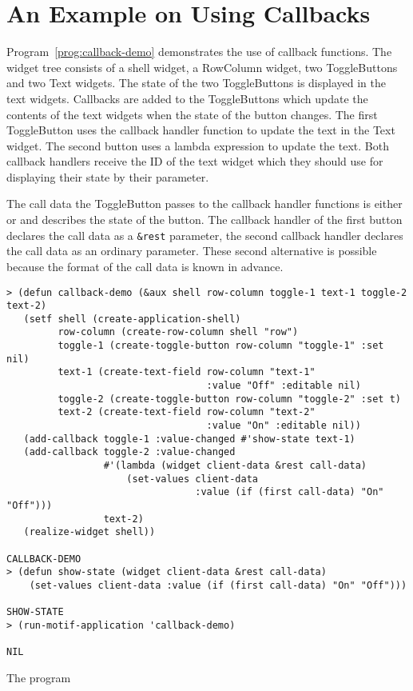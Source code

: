 \section{An Example on Using Callbacks}

Program~\ref{prog:callback-demo} demonstrates the use of callback functions. 
The widget tree consists of a shell widget, a RowColumn widget, two
ToggleButtons and two Text widgets.  The state of the two ToggleButtons is
displayed in the text widgets.  Callbacks are added to the ToggleButtons which
update the contents of the text widgets when the state of the button changes. 
The first ToggleButton uses the callback handler function  to
update the text in the Text widget.  The second button uses a lambda expression
to update the text.  Both callback handlers receive the ID of the text widget
which they should use for displaying their state by their 
parameter. 

The call data the ToggleButton passes to the callback handler functions is
either  or  and describes the state of the button.  The
callback handler of the first button declares the call data as a \verb+&rest+
parameter, the second callback handler declares the call data as an ordinary
parameter.  These second alternative is possible because the format of the call
data is known in advance. 

\begin{proglist}
\fnsize\begin{verbatim}
> (defun callback-demo (&aux shell row-column toggle-1 text-1 toggle-2 text-2)
   (setf shell (create-application-shell)
         row-column (create-row-column shell "row")
         toggle-1 (create-toggle-button row-column "toggle-1" :set nil)
         text-1 (create-text-field row-column "text-1"
                                   :value "Off" :editable nil)
         toggle-2 (create-toggle-button row-column "toggle-2" :set t)
         text-2 (create-text-field row-column "text-2"
                                   :value "On" :editable nil))
   (add-callback toggle-1 :value-changed #'show-state text-1)
   (add-callback toggle-2 :value-changed 
                 #'(lambda (widget client-data &rest call-data)
                     (set-values client-data 
                                 :value (if (first call-data) "On" "Off")))
                 text-2)
   (realize-widget shell))

CALLBACK-DEMO
> (defun show-state (widget client-data &rest call-data)
    (set-values client-data :value (if (first call-data) "On" "Off")))

SHOW-STATE
> (run-motif-application 'callback-demo)

NIL
\end{verbatim}\normalsize
\caption{\label{prog:callback-demo}The program }
\end{proglist}

